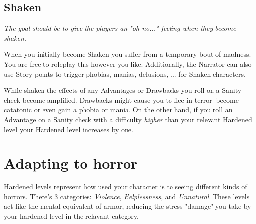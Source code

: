 \subsection{Shaken}
\textit{The goal should be to give the players an "oh no..." feeling when they become shaken.}

When you initially become Shaken you suffer from a temporary bout of madness. 
You are free to roleplay this however you like. 
Additionally, the Narrator can also use Story points to trigger 
phobias, manias, delusions, ... for Shaken characters.


While shaken the effects of any Advantages or Drawbacks you roll on a Sanity check become amplified.
Drawbacks might cause you to flee in terror, become catatonic or even gain a phobia or mania.
On the other hand, if you roll an Advantage on a Sanity check with a difficulty \textit{higher}
than your relevant Hardened level your Hardened level increases by one.




\section{Adapting to horror}

Hardened levels represent how used your character is to seeing different kinds of horrors.
There's 3 categories: \textit{Violence}, \textit{Helplessness}, and \textit{Unnatural}.
These levels act like the mental equivalent of armor, reducing the stress "damage" 
you take by your hardened level in the relavant category.

